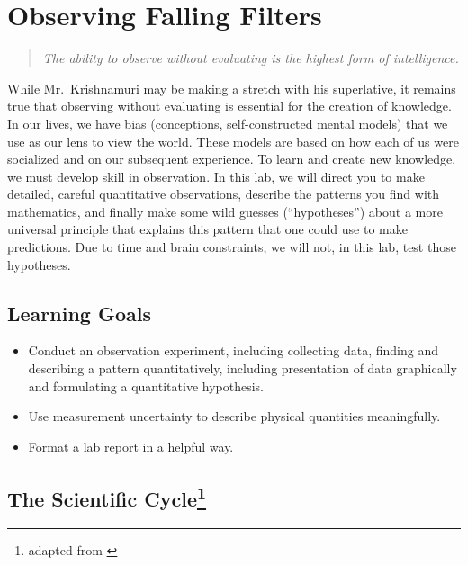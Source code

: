 \chapter{Observing Falling Filters}

	\begin{quotation}
		\textit{The ability to observe without evaluating is the highest form of intelligence.} 
	\end{quotation}

While Mr.\ Krishnamuri may be making a stretch with his superlative, it remains true that observing without evaluating is essential for the creation of knowledge.
In our lives, we have bias (conceptions, self-constructed mental models) that we use as our lens to view the world.
These models are based on how each of us were socialized and on our subsequent experience.
To learn and create new knowledge, we must develop skill in observation.
In this lab, we will direct you to make detailed, careful quantitative observations, describe the patterns you find with mathematics, and finally make some wild guesses (``hypotheses'') about a more universal principle that explains this pattern that one could use to make predictions.
Due to time and brain constraints, we will not, in this lab, test those hypotheses.

\section*{Learning Goals}

 \begin{itemize}

  \item Conduct an observation experiment, including collecting data, finding and describing a pattern quantitatively, including presentation of data graphically and formulating a quantitative hypothesis.

  \item Use measurement uncertainty to describe physical quantities meaningfully.
  
  \item Format a lab report in a helpful way.
 \end{itemize}

\section*{The Scientific Cycle\protect\footnote{adapted from \cite{etkina_college_2014}}}

